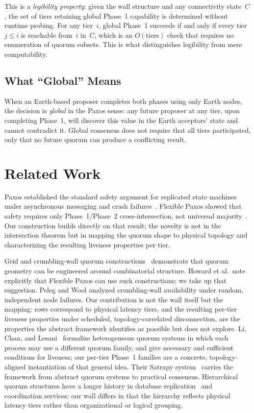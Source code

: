 \documentclass[11pt]{article}
\begin{document}
This is a \emph{legibility property}: given the wall structure and any connectivity state~$C$, the set of tiers retaining global Phase~1 capability is determined without runtime probing. For any tier~$i$, global Phase~1 succeeds if and only if every tier~$j \le i$ is reachable from~$i$ in~$C$, which is an $O(\text{tiers})$ check that requires no enumeration of quorum subsets. This is what distinguishes legibility from mere computability.

\subsection{What ``Global'' Means}

When an Earth-based proposer completes both phases using only Earth nodes, the decision is \emph{global} in the Paxos sense: any future proposer at any tier, upon completing Phase~1, will discover this value in the Earth acceptors' state and cannot contradict it. Global consensus does not require that all tiers participated, only that no future quorum can produce a conflicting result.


\section{Related Work}

Paxos established the standard safety argument for replicated state machines under asynchronous messaging and crash failures~\cite{lamport1998}. Flexible Paxos showed that safety requires only Phase~1/Phase~2 cross-intersection, not universal majority~\cite{howard2016}. Our construction builds directly on that result; the novelty is not in the intersection theorem but in mapping the quorum shape to physical topology and characterizing the resulting liveness properties per tier.

Grid and crumbling-wall quorum constructions~\cite{cheung1992,peleg1995} demonstrate that quorum geometry can be engineered around combinatorial structure. Howard et al.\ note explicitly that Flexible Paxos can use such constructions; we take up that suggestion. Peleg and Wool analyzed crumbling-wall availability under random, independent node failures. Our contribution is not the wall itself but the mapping: rows correspond to physical latency tiers, and the resulting per-tier liveness properties under scheduled, topology-correlated disconnection, are the properties the abstract framework identifies as possible but does not explore. Li, Chan, and Lesani~\cite{li2023} formalize heterogeneous quorum systems in which each process may use a different quorum family, and give necessary and sufficient conditions for liveness; our per-tier Phase~1 families are a concrete, topology-aligned instantiation of that general idea. Their Satrapy system~\cite{li2026satrapy} carries the framework from abstract quorum systems to practical consensus. Hierarchical quorum structures have a longer history in database replication~\cite{daudjee2004} and coordination services; our wall differs in that the hierarchy reflects physical latency tiers rather than organizational or logical grouping.
\end{document}
